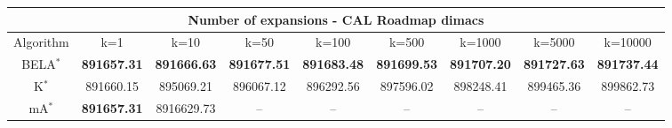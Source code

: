 \begin{tabular}{c|cccccccc}\toprule
\multicolumn{9}{c}{Number of expansions - CAL Roadmap dimacs}\\ \midrule
Algorithm & k=1 & k=10 & k=50 & k=100 & k=500 & k=1000 & k=5000 & k=10000 \\ \midrule
BELA$^*$ & \textbf{891657.31} & \textbf{891666.63} & \textbf{891677.51} & \textbf{891683.48} & \textbf{891699.53} & \textbf{891707.20} & \textbf{891727.63} & \textbf{891737.44} \\
K$^*$ & 891660.15 & 895069.21 & 896067.12 & 896292.56 & 897596.02 & 898248.41 & 899465.36 & 899862.73 \\
mA$^*$ & \textbf{891657.31} & 8916629.73 & -- & -- & -- & -- & -- & -- \\ \bottomrule 
\end{tabular}
